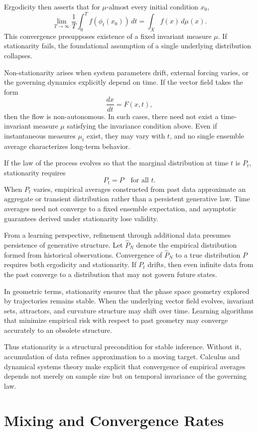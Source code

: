 \documentclass[12pt]{book}
\begin{document}
Ergodicity then asserts that for $\mu$-almost every initial condition $x_0$,
\[
\lim_{T \to \infty}
\frac{1}{T}
\int_0^T
f(\phi_t(x_0))\, dt
=
\int_X f(x)\, d\mu(x).
\]
This convergence presupposes existence of a fixed invariant measure $\mu$. If stationarity fails, the foundational assumption of a single underlying distribution collapses.

Non-stationarity arises when system parameters drift, external forcing varies, or the governing dynamics explicitly depend on time. If the vector field takes the form
\[
\frac{dx}{dt} = F(x,t),
\]
then the flow is non-autonomous. In such cases, there need not exist a time-invariant measure $\mu$ satisfying the invariance condition above. Even if instantaneous measures $\mu_t$ exist, they may vary with $t$, and no single ensemble average characterizes long-term behavior.

If the law of the process evolves so that the marginal distribution at time $t$ is $P_t$, stationarity requires
\[
P_t = P
\quad \text{for all } t.
\]
When $P_t$ varies, empirical averages constructed from past data approximate an aggregate or transient distribution rather than a persistent generative law. Time averages need not converge to a fixed ensemble expectation, and asymptotic guarantees derived under stationarity lose validity.

From a learning perspective, refinement through additional data presumes persistence of generative structure. Let $\hat{P}_N$ denote the empirical distribution formed from historical observations. Convergence of $\hat{P}_N$ to a true distribution $P$ requires both ergodicity and stationarity. If $P_t$ drifts, then even infinite data from the past converge to a distribution that may not govern future states.

In geometric terms, stationarity ensures that the phase space geometry explored by trajectories remains stable. When the underlying vector field evolves, invariant sets, attractors, and curvature structure may shift over time. Learning algorithms that minimize empirical risk with respect to past geometry may converge accurately to an obsolete structure.

Thus stationarity is a structural precondition for stable inference. Without it, accumulation of data refines approximation to a moving target. Calculus and dynamical systems theory make explicit that convergence of empirical averages depends not merely on sample size but on temporal invariance of the governing law.

\section{Mixing and Convergence Rates}
\end{document}
